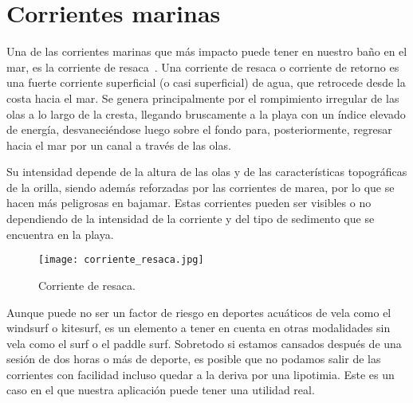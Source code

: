 \section{Corrientes marinas}

Una de las corrientes marinas que más impacto puede tener en nuestro 
baño en el mar, es la corriente de resaca~\cite{RESACA}.
Una corriente de resaca o corriente de retorno es una fuerte corriente
 superficial (o casi superficial) de agua, que retrocede desde la costa
 hacia el mar. Se genera principalmente por el rompimiento irregular de
 las olas a lo largo de la cresta, llegando bruscamente a la playa con un
 índice elevado de energía, desvaneciéndose luego sobre el fondo para,
 posteriormente, regresar hacia el mar por un canal a través de las olas.

Su intensidad depende de la altura de las olas y de las características
 topográficas de la orilla, siendo además reforzadas por las corrientes 
de marea, por lo que se hacen más peligrosas en bajamar. Estas corrientes
 pueden ser visibles o no dependiendo de la intensidad de la corriente 
y del tipo de sedimento que se encuentra en la playa.

\begin{figure}[hb]
\texttt{[image: corriente\_resaca.jpg]} 
\caption{Corriente de resaca.}
\end{figure}

Aunque puede no ser un factor de riesgo en deportes acuáticos de vela
 como el windsurf o kitesurf, es un elemento a tener en cuenta en otras
 modalidades sin vela como el surf o el paddle surf. Sobretodo si estamos 
cansados después de una sesión de dos horas o más de deporte, es posible 
que no podamos salir de las corrientes con facilidad incluso quedar a la
 deriva por una lipotimia. Este es un caso en el que nuestra aplicación
 puede tener una utilidad real.
